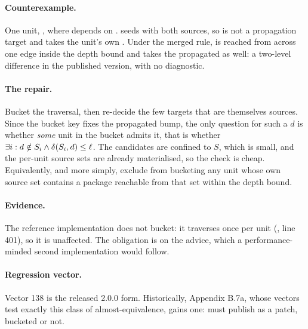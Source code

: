 \paragraph{Counterexample.} One unit, , where
 depends on .  seeds  with both
sources, so  is not a propagation target and takes the unit's own
\bpatch. Under the merged rule,  is reached from  across
one edge inside the depth bound and takes the propagated \bmajor{} as well:
a two-level difference in the published version, with no diagnostic.

\paragraph{The repair.} Bucket the traversal, then re-decide the few targets
that are themselves sources. Since the bucket key fixes the propagated bump,
the only question for such a $d$ is whether \emph{some} unit in the bucket
admits it, that is whether $\exists i: d \notin S_i \land \delta(S_i,d) \leq
\ell$. The candidates are confined to $S$, which is small, and the per-unit
source sets are already materialised, so the check is cheap. Equivalently, and
more simply, exclude from bucketing any unit whose own source set contains a
package reachable from that set within the depth bound.

\paragraph{Evidence.} The reference implementation does not bucket: it
traverses once per unit (,
line 401), so it is unaffected. The obligation is on the advice, which a
performance-minded second implementation would follow.

\paragraph{Regression vector.} Vector 138 is the released 2.0.0 form. Historically, \SPEC{} Appendix B.7a, whose vectors test
exactly this class of almost-equivalence, gains one: 
must publish  as a patch, bucketed or not.
